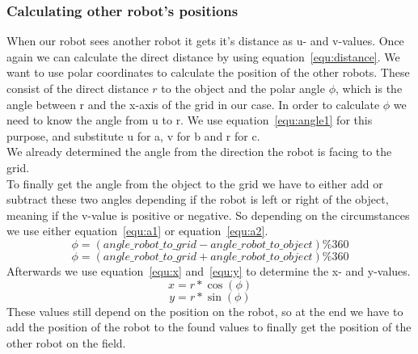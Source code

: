 \documentclass[lnicst,a4paper]{svmultln}
\begin{document}
\subsubsection{Calculating other robot's positions}
When our robot sees another robot it gets it's distance as u- and v-values. Once again we can calculate the direct distance by using equation~\ref{equ:distance}. We want to use polar coordinates to calculate the position of the other robots. These consist of the direct distance \(r\) to the object and the polar angle \(\phi\), which is the angle between r and the x-axis of the grid in our case. In order to calculate \(\phi\) we need to know the angle from u to r. We use equation~\ref{equ:angle1} for this purpose, and substitute u for a, v for b and r for c. 
\\
We already determined the angle from the direction the robot is facing to the grid.
\\
To finally get the angle from the object to the grid we have to either add or subtract these two angles depending if the robot is left or right of the object, meaning if the v-value is positive or negative. So depending on the circumstances we use either equation~\ref{equ:a1} or equation~\ref{equ:a2}.
\begin{equation}
	\phi = (angle\_robot\_to\_grid - angle\_robot\_to\_object) \% 360
	\label{equ:a1}
\end{equation}
\begin{equation}
	\phi = (angle\_robot\_to\_grid + angle\_robot\_to\_object) \% 360
	\label{equ:a2}
\end{equation}
Afterwards we use equation~\ref{equ:x} and~\ref{equ:y} to determine the x- and y-values.
\begin{equation}
	x = r*\cos(\phi)
	\label{equ:x}
\end{equation}
\begin{equation}
	y = r*\sin(\phi)
	\label{equ:y}
\end{equation}
These values still depend on the position on the robot, so at the end we have to add the position of the robot to the found values to finally get the position of the other robot on the field.

\end{document}
